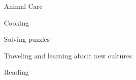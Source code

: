 



\cventry
{} %
{} %
{} %
{} %
{ %
\begin{cvitems}
  \item {Animal Care}
  \item {Cooking}
  \item {Solving puzzles}
  \item {Traveling and learning about new cultures}
  \item {Reading}
\end{cvitems}
}
